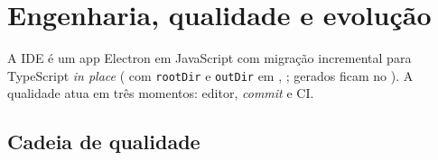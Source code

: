 \section{Engenharia, qualidade e evolução}
\label{sec:S15-engenharia-evolucao}

A IDE  é um app Electron em JavaScript com migração incremental para TypeScript \emph{in place} ( com \lstinline|rootDir| e \lstinline|outDir| em , ;  gerados ficam no ). A qualidade atua em três momentos: editor, \emph{commit} e CI.

\subsection{Cadeia de qualidade}
\label{sub:S15-cadeia}

